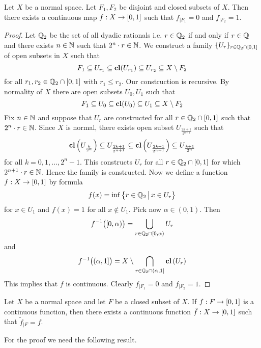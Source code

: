 \begin{theorem}[Urysohn]\label{theorem:Urysohn_lemma}
	Let $X$ be a normal space. Let $F_1,F_2$ be disjoint and closed subsets of $X$. Then there exists a continuous map $f:X\rightarrow [0,1]$ such that $f_{\mid F_1} = 0$ and $f_{\mid F_2} = 1$.
\end{theorem}
\begin{proof}
	Let ${\mathbb Q}_2$ be the set of all dyadic rationals i.e. $r \in {\mathbb Q}_2$ if and only if $r \in {\mathbb Q}$ and there exists $n \in {\mathbb N}$ such that $2^n\cdot r \in {\mathbb N}$. We construct a family $\{U_r\}_{r \in {\mathbb Q}_2\cap [0,1]}$ of open subsets in $X$ such that
	$$F_1 \subseteq U_{r_1}\subseteq \mathbf{cl}(U_{r_1}) \subseteq U_{r_2} \subseteq X\setminus F_2$$
	for all $r_1,r_2\in {\mathbb Q}_2\cap [0,1]$ with $r_1 \leq r_2$. Our construction is recursive. By normality of $X$ there are open subsets $U_0, U_1$ such that
	$$F_1 \subseteq U_0 \subseteq \mathbf{cl}(U_0) \subseteq U_1 \subseteq X\setminus F_2$$
	Fix $n \in {\mathbb N}$ and suppose that $U_r$ are constructed for all $r \in {\mathbb Q}_2\cap [0,1]$ such that $2^n\cdot r \in {\mathbb N}$. Since $X$ is normal, there exists open subset $U_{\frac{2k + 1}{2^{n+1}}}$ such that
	$$\mathbf{cl}\left(U_{\frac{k}{2^n}}\right) \subseteq U_{\frac{2k + 1}{2^{n+1}}} \subseteq \mathbf{cl}\left(U_{\frac{2k + 1}{2^{n+1}}}\right) \subseteq U_{\frac{k+1}{2^n}}$$
	for all $k = 0,1,...,2^n - 1$. This constructs $U_r$ for all $r \in {\mathbb Q}_2\cap [0,1]$ for which $2^{n+1}\cdot r \in {\mathbb N}$. Hence the family is constructed. Now we define a function $f:X\rightarrow [0,1]$ by formula
	$$f(x) = \inf \big\{r\in {\mathbb Q}_2\,\big|\,x\in U_r\big\}$$
	for $x \in U_1$ and $f(x) = 1$ for all $x \not \in U_1$. Pick now $\alpha \in (0, 1)$. Then
	$$f^{-1}\big([0,\alpha)\big) = \bigcup_{r \in {\mathbb Q}_2\cap [0,\alpha)}U_r$$
				and
			$$f^{-1}\big((\alpha, 1]\big) = X\setminus \bigcap_{r\in {\mathbb Q}_2\cap (\alpha, 1]}\mathbf{cl}\left(U_r\right)$$
	This implies that $f$ is continuous. Clearly $f_{\mid F_1} = 0$ and $f_{\mid F_2} = 1$.
\end{proof}

\begin{theorem}[Tietze]\label{theorem:Tietze_extension_theorem}
	Let $X$ be a normal space and let $F$ be a closed subset of $X$. If $f:F\rightarrow [0,1]$ is a continuous function, then there exists a continuous function $\tilde{f}:X\rightarrow [0,1]$ such that $\tilde{f}_{\mid F} = f$.
\end{theorem}
\noindent
For the proof we need the following result.

